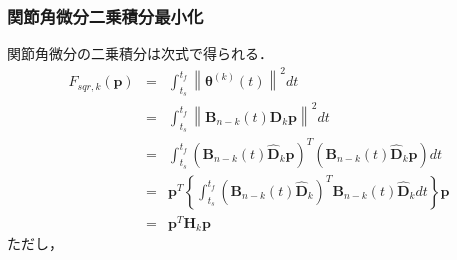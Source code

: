 \subsubsection*{関節角微分二乗積分最小化}

関節角微分の二乗積分は次式で得られる．
\begin{eqnarray}
  F_{sqr,k}(\bm{p})
  &=& \int_{t_s}^{t_f} \left\| \bm{\theta}^{(k)}(t) \right\|^2 dt \\
  &=& \int_{t_s}^{t_f} \left\| \bm{B}_{n-k}(t) \bm{\hat{D}}_k \bm{p} \right\|^2 dt \\
  &=& \int_{t_s}^{t_f} \left( \bm{B}_{n-k}(t) \bm{\hat{D}}_k \bm{p} \right)^T \left( \bm{B}_{n-k}(t) \bm{\hat{D}}_k \bm{p} \right) dt \\
  &=& \bm{p}^T \left\{ \int_{t_s}^{t_f} \left( \bm{B}_{n-k}(t) \bm{\hat{D}}_k \right)^T \bm{B}_{n-k}(t) \bm{\hat{D}}_k dt \right\} \bm{p} \\
  &=& \bm{p}^T \bm{H}_k \bm{p} \label{eq:bspline-square-integration}
\end{eqnarray}
ただし，
